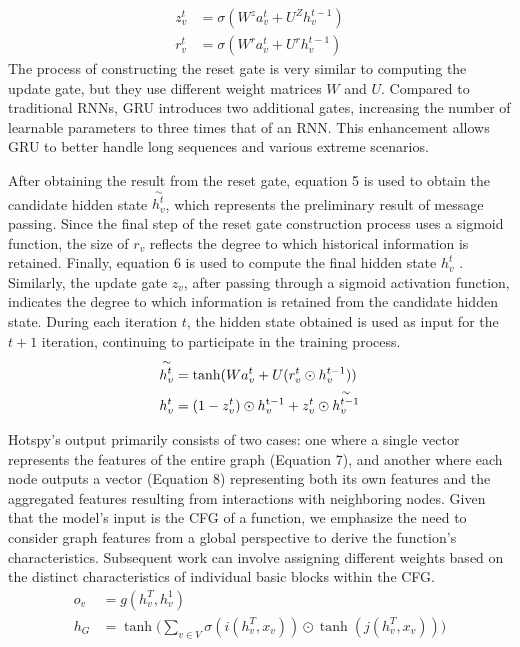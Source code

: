 \documentclass[lineno,sn-mathphys]{sn-jnl}%
\theoremstyle{thmstyleone}%
\theoremstyle{thmstyletwo}%
\theoremstyle{thmstylethree}%
\begin{document}
\begin{align}
      z_v^t &= \sigma ({W^z}a_v^t + {U^Z}h_v^{t - 1})\\
      r_v^t &= \sigma ({W^r}a_v^t + {U^r}h_v^{t - 1})
\end{align}
The process of constructing the reset gate is very similar to computing the update gate, but they use different weight matrices 
\(W\) and \(U\). Compared to traditional RNNs, GRU introduces two additional gates, increasing the number of learnable parameters to three times that of an RNN. This enhancement allows GRU to better handle long sequences and various extreme scenarios.\par
After obtaining the result from the reset gate, equation 5 is used to obtain the candidate hidden state \( \overset{\sim}{h_{v}^{t}} \), which represents the preliminary result of message passing. Since the final step of the reset gate construction process uses a sigmoid function, the size of \({r_v}\) reflects the degree to which historical information is retained. Finally, equation 6 is used to compute the final hidden state \(h_v^t\) . Similarly, the update gate \({z_v}\), after passing through a sigmoid activation function, indicates the degree to which information is retained from the candidate hidden state.
During each iteration \(t\), the hidden state obtained is used as input for the \(t+1\) iteration, continuing to participate in the training process.
\begin{align}
    \mathop {h_v^t}\limits^ \sim   &= \tanh (Wa_v^t + U(r_v^t \odot h_v^{t - 1}))\\
    h_v^t &= (1 - z_v^t) \odot h_v^{{\rm{t - 1}}} + z_v^t \odot \overset{\sim}{h_{v}^{t-1}}
\end{align}\par
Hotspy's output primarily consists of two cases: one where a single vector represents the features of the entire graph (Equation 7), and another where each node outputs a vector (Equation 8) representing both its own features and the aggregated features resulting from interactions with neighboring nodes. Given that the model's input is the CFG of a function, we emphasize the need to consider graph features from a global perspective to derive the function's characteristics. Subsequent work can involve assigning different weights based on the distinct characteristics of individual basic blocks within the CFG.
\begin{align}
    {o_v} &= g(h_v^T,h_v^1)\\
    {h_G} &= \tanh (\sum\limits_{v \in V} {\sigma (i(h_v^T,{x_v})) \odot \tanh (j(h_v^T,{x_v})))}
\end{align}
\end{document}
